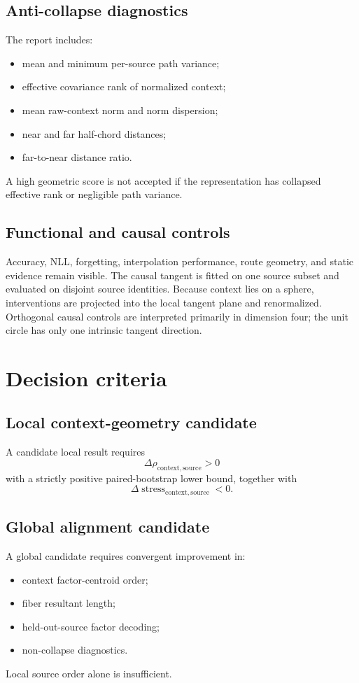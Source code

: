 \documentclass[11pt]{article}
\begin{document}
\subsection{Anti-collapse diagnostics}
The report includes:
\begin{itemize}
    \item mean and minimum per-source path variance;
    \item effective covariance rank of normalized context;
    \item mean raw-context norm and norm dispersion;
    \item near and far half-chord distances;
    \item far-to-near distance ratio.
\end{itemize}
A high geometric score is not accepted if the representation has collapsed effective rank or negligible path variance.

\subsection{Functional and causal controls}
Accuracy, NLL, forgetting, interpolation performance, route geometry, and static evidence remain visible. The causal tangent is fitted on one source subset and evaluated on disjoint source identities. Because context lies on a sphere, interventions are projected into the local tangent plane and renormalized. Orthogonal causal controls are interpreted primarily in dimension four; the unit circle has only one intrinsic tangent direction.

\section{Decision criteria}
\subsection{Local context-geometry candidate}
A candidate local result requires
\[
 \Delta\rho_{\mathrm{context,source}}>0
\]
with a strictly positive paired-bootstrap lower bound, together with
\[
 \Delta\operatorname{stress}_{\mathrm{context,source}}<0.
\]

\subsection{Global alignment candidate}
A global candidate requires convergent improvement in:
\begin{itemize}
    \item context factor-centroid order;
    \item fiber resultant length;
    \item held-out-source factor decoding;
    \item non-collapse diagnostics.
\end{itemize}
Local source order alone is insufficient.
\end{document}
